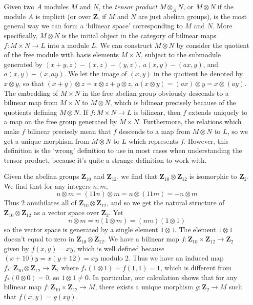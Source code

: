 Given two $A$ modules $M$ and $N$, the \emph{tensor product} $M \otimes_A N$, or $M \otimes N$ if the module $A$ is implicit (or over $\mathbf{Z}$, if $M$ and $N$ are just abelian groups), is the most general way we can form a `bilinear space' corresponding to $M$ and $N$. More specifically, $M \otimes N$ is the initial object in the category of bilinear maps $f: M \times N \to L$ into a module $L$. We can construct $M \otimes N$ by consider the quotient of the free module with basis elements $M \times N$, subject to the submodule generated by $(x + y, z) - (x,z) - (y,z)$, $a(x,y) - (ax,y)$, and $a(x,y) - (x,ay)$. We let the image of $(x,y)$ in the quotient be denoted by $x \otimes y$, so that $(x + y) \otimes z = x \otimes z + y \otimes z$, $a(x \otimes y) = (ax) \otimes y = x \otimes (ay)$. The embedding of $M \times N$ in the free abelian group obviously descends to a bilinear map from $M \times N$ to $M \otimes N$, which is bilinear precisely because of the quotients defining $M \otimes N$. If $f: M \times N \to L$ is bilinear, then $f$ extends uniquely to a map on the free group generated by $M \times N$. Furthermore, the relations which make $f$ bilinear precisely mean that $f$ descends to a map from $M \otimes N$ to $L$, so we get a unique morphism from $M \otimes N$ to $L$ which represents $f$. However, this definition is the `wrong' definition to use in most cases when understanding the tensor product, because it's quite a strange definition to work with.

\begin{example}
    Given the abelian groups $\mathbf{Z}_{10}$ and $\mathbf{Z}_{12}$, we find that $\mathbf{Z}_{10} \otimes \mathbf{Z}_{12}$ is isomorphic to $\mathbf{Z}_2$. We find that for any integers $n,m$,
    \[ n \otimes m = (11n) \otimes m = n \otimes (11m) = - n \otimes m \]
    Thus $2$ annihilates all of $\mathbf{Z}_{10} \otimes \mathbf{Z}_{12}$, and so we get the natural structure of $\mathbf{Z}_{10} \otimes \mathbf{Z}_{12}$ as a vector space over $\mathbf{Z}_2$. Yet
    \[ n \otimes m = n(1 \otimes m) = (nm)(1 \otimes 1) \]
    so the vector space is generated by a single element $1 \otimes 1$. The element $1 \otimes 1$ doesn't equal to zero in $\mathbf{Z}_{10} \otimes \mathbf{Z}_{12}$. We have a bilinear map $f: \mathbf{Z}_{10} \times \mathbf{Z}_{12} \to \mathbf{Z}_2$ given by $f(x,y) = xy$, which is well defined because $(x + 10)y = x(y + 12) = xy$ modulo 2. Thus we have an induced map $f_*: \mathbf{Z}_{10} \otimes \mathbf{Z}_{12} \to \mathbf{Z}_2$ where $f_*(1 \otimes 1) = f(1,1) = 1$, which is different from $f_*(0 \otimes 0) = 0$, so $1 \otimes 1 \neq 0$. In particular, our calculation shows that for any bilinear map $f: \mathbf{Z}_{10} \times \mathbf{Z}_{12} \to M$, there exists a unique morphism $g: \mathbf{Z}_2 \to M$ such that $f(x,y) = g(xy)$.
\end{example}

